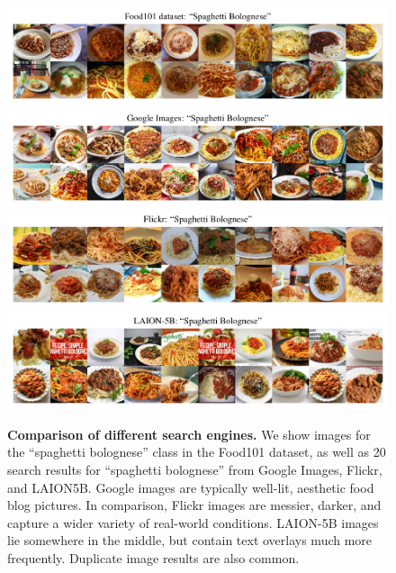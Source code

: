 \begin{figure}[p]
    \centering
    \includegraphics{figures/food-spaghetti.pdf} \\
    \includegraphics{figures/google-spaghetti.pdf} \\
    \includegraphics{figures/flickr-spaghetti.pdf} \\
    \includegraphics{figures/laion5b-spaghetti.pdf} 
    \caption{\textbf{Comparison of different search engines.} We show images for the ``spaghetti bolognese'' class in the Food101 dataset, as well as 20 search results for ``spaghetti bolognese'' from Google Images, Flickr, and LAION5B. Google images are typically well-lit, aesthetic food blog pictures. In comparison, Flickr images are messier, darker, and capture a wider variety of real-world conditions. LAION-5B images lie somewhere in the middle, but contain text overlays much more frequently. Duplicate image results are also common.}
    \label{fig:data_comparison}
\end{figure}

